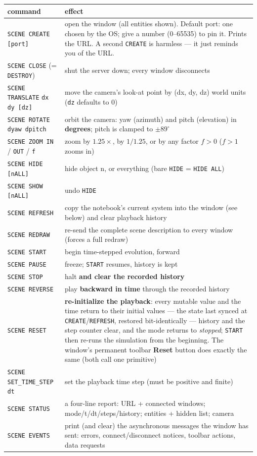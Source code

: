 \documentclass[11pt]{article}
\newcommand{\kw}[1]{\texttt{\uppercase{#1}}}
\newcommand{\code}[1]{\texttt{#1}}
\begin{document}
\begin{longtable}{lp{9.4cm}}
\textbf{command} & \textbf{effect}\\\hline
\endhead
\kw{scene create} \code{[port]} & open the window (all entities shown). Default port: one chosen by the OS; give a number (0--65535) to pin it. Prints the URL. A second \kw{create} is harmless --- it just reminds you of the URL.\\
\kw{scene close} (= \kw{destroy}) & shut the server down; every window disconnects\\
\kw{scene translate} \code{dx dy [dz]} & move the camera's look-at point by (dx, dy, dz) world units (\code{dz} defaults to 0)\\
\kw{scene rotate} \code{dyaw dpitch} & orbit the camera: yaw (azimuth) and pitch (elevation) in \textbf{degrees}; pitch is clamped to $\pm89^\circ$\\
\kw{scene zoom in} / \kw{out} / \code{f} & zoom by $1.25\times$, by $1/1.25$, or by any factor $f > 0$ ($f > 1$ zooms in)\\
\kw{scene hide} \code{[n\textbar ALL]} & hide object n, or everything (bare \kw{hide} = \kw{hide all})\\
\kw{scene show} \code{[n\textbar ALL]} & undo \kw{hide}\\
\kw{scene refresh} & copy the notebook's current system into the window (see below) and clear playback history\\
\kw{scene redraw} & re-send the complete scene description to every window (forces a full redraw)\\
\kw{scene start} & begin time-stepped evolution, forward\\
\kw{scene pause} & freeze; \kw{start} resumes, history is kept\\
\kw{scene stop} & halt \textbf{and clear the recorded history}\\
\kw{scene reverse} & play \textbf{backward in time} through the recorded history\\
\kw{scene reset} & \textbf{re-initialize the playback}: every mutable value and the time return to their initial values --- the state last synced at \kw{create}/\kw{refresh}, restored bit-identically --- history and the step counter clear, and the mode returns to \emph{stopped}; \kw{start} then re-runs the simulation from the beginning. The window's permanent toolbar \textbf{Reset} button does exactly the same (both call one primitive)\\
\kw{scene set\_time\_step} \code{dt} & set the playback time step (must be positive and finite)\\
\kw{scene status} & a four-line report: URL + connected windows; mode/t/dt/steps/history; entities + hidden list; camera\\
\kw{scene events} & print (and clear) the asynchronous messages the window has sent: errors, connect/disconnect notices, toolbar actions, data requests\\
\end{longtable}
\end{document}

